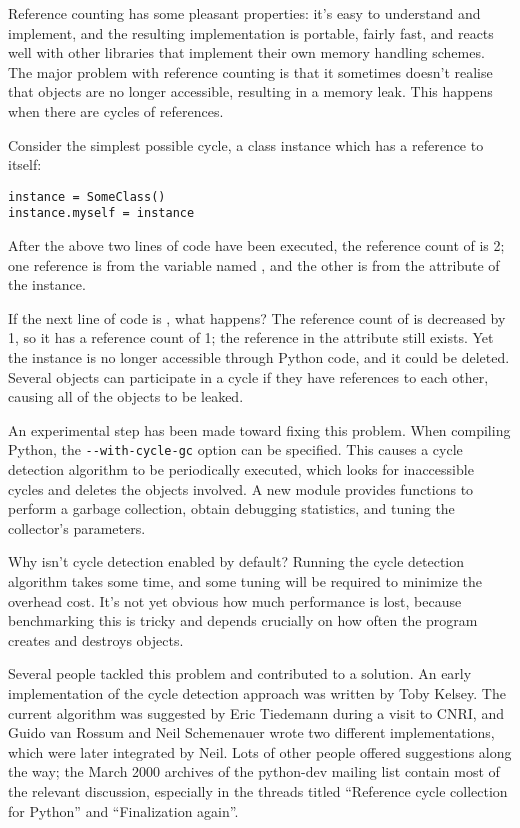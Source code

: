 \documentclass{howto}
\begin{document}
Reference counting has some pleasant properties: it's easy to
understand and implement, and the resulting implementation is
portable, fairly fast, and reacts well with other libraries that
implement their own memory handling schemes.  The major problem with
reference counting is that it sometimes doesn't realise that objects
are no longer accessible, resulting in a memory leak.  This happens
when there are cycles of references.

Consider the simplest possible cycle, 
a class instance which has a reference to itself:

\begin{verbatim}
instance = SomeClass()
instance.myself = instance
\end{verbatim}

After the above two lines of code have been executed, the reference
count of  is 2; one reference is from the variable
named , and the other is from the 
attribute of the instance.  

If the next line of code is , what happens?  The
reference count of  is decreased by 1, so it has a
reference count of 1; the reference in the  attribute
still exists.  Yet the instance is no longer accessible through Python
code, and it could be deleted.  Several objects can participate in a
cycle if they have references to each other, causing all of the
objects to be leaked.

An experimental step has been made toward fixing this problem.  When
compiling Python, the \verb|--with-cycle-gc| option can be specified.
This causes a cycle detection algorithm to be periodically executed,
which looks for inaccessible cycles and deletes the objects involved.
A new  module provides functions to perform a garbage
collection, obtain debugging statistics, and tuning the collector's parameters.

Why isn't cycle detection enabled by default?  Running the cycle detection
algorithm takes some time, and some tuning will be required to
minimize the overhead cost.  It's not yet obvious how much performance
is lost, because benchmarking this is tricky and depends crucially
on how often the program creates and destroys objects. 

Several people tackled this problem and contributed to a solution.  An
early implementation of the cycle detection approach was written by
Toby Kelsey.  The current algorithm was suggested by Eric Tiedemann
during a visit to CNRI, and Guido van Rossum and Neil Schemenauer
wrote two different implementations, which were later integrated by
Neil.  Lots of other people offered suggestions along the way; the
March 2000 archives of the python-dev mailing list contain most of the
relevant discussion, especially in the threads titled ``Reference
cycle collection for Python'' and ``Finalization again''.
\end{document}
